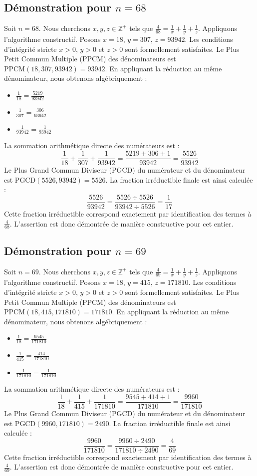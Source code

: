 \documentclass[11pt,a4paper]{article}
\begin{document}
\subsection{Démonstration pour $n = 68$}
Soit $n = 68$. Nous cherchons $x, y, z \in \mathbb{Z}^{+}$ tels que $\frac{4}{68} = \frac{1}{x} + \frac{1}{y} + \frac{1}{z}$.
Appliquons l'algorithme constructif. Posons $x = 18$, $y = 307$, $z = 93942$.
Les conditions d'intégrité stricte $x > 0$, $y > 0$ et $z > 0$ sont formellement satisfaites.
Le Plus Petit Commun Multiple (PPCM) des dénominateurs est $\text{PPCM}(18, 307, 93942) = 93942$.
En appliquant la réduction au même dénominateur, nous obtenons algébriquement :
\begin{itemize}
    \item $\frac{1}{18} = \frac{5219}{93942}$
    \item $\frac{1}{307} = \frac{306}{93942}$
    \item $\frac{1}{93942} = \frac{1}{93942}$
\end{itemize}
La sommation arithmétique directe des numérateurs est :
$$ \frac{1}{18} + \frac{1}{307} + \frac{1}{93942} = \frac{5219 + 306 + 1}{93942} = \frac{5526}{93942} $$
Le Plus Grand Commun Diviseur (PGCD) du numérateur et du dénominateur est $\text{PGCD}(5526, 93942) = 5526$.
La fraction irréductible finale est ainsi calculée :
$$ \frac{5526}{93942} = \frac{5526 \div 5526}{93942 \div 5526} = \frac{1}{17} $$
Cette fraction irréductible correspond exactement par identification des termes à $\frac{4}{68}$. L'assertion est donc démontrée de manière constructive pour cet entier.

\subsection{Démonstration pour $n = 69$}
Soit $n = 69$. Nous cherchons $x, y, z \in \mathbb{Z}^{+}$ tels que $\frac{4}{69} = \frac{1}{x} + \frac{1}{y} + \frac{1}{z}$.
Appliquons l'algorithme constructif. Posons $x = 18$, $y = 415$, $z = 171810$.
Les conditions d'intégrité stricte $x > 0$, $y > 0$ et $z > 0$ sont formellement satisfaites.
Le Plus Petit Commun Multiple (PPCM) des dénominateurs est $\text{PPCM}(18, 415, 171810) = 171810$.
En appliquant la réduction au même dénominateur, nous obtenons algébriquement :
\begin{itemize}
    \item $\frac{1}{18} = \frac{9545}{171810}$
    \item $\frac{1}{415} = \frac{414}{171810}$
    \item $\frac{1}{171810} = \frac{1}{171810}$
\end{itemize}
La sommation arithmétique directe des numérateurs est :
$$ \frac{1}{18} + \frac{1}{415} + \frac{1}{171810} = \frac{9545 + 414 + 1}{171810} = \frac{9960}{171810} $$
Le Plus Grand Commun Diviseur (PGCD) du numérateur et du dénominateur est $\text{PGCD}(9960, 171810) = 2490$.
La fraction irréductible finale est ainsi calculée :
$$ \frac{9960}{171810} = \frac{9960 \div 2490}{171810 \div 2490} = \frac{4}{69} $$
Cette fraction irréductible correspond exactement par identification des termes à $\frac{4}{69}$. L'assertion est donc démontrée de manière constructive pour cet entier.
\end{document}
